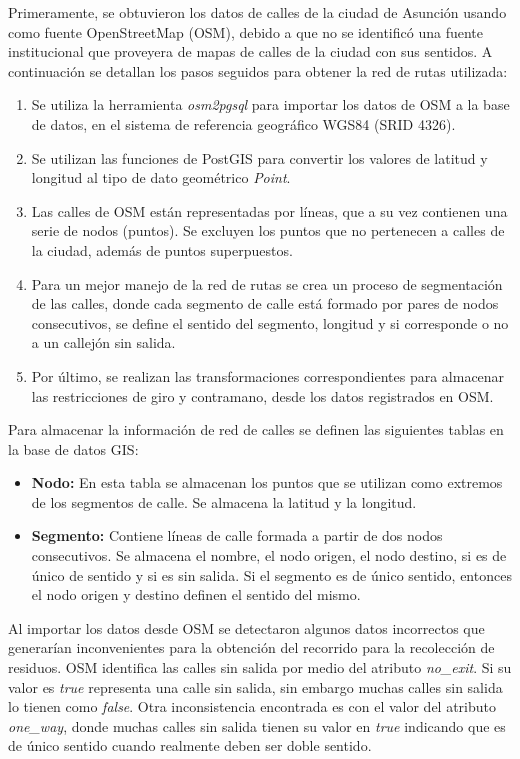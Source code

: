 Primeramente, se obtuvieron los datos de calles de la ciudad de Asunción usando como fuente OpenStreetMap (OSM), debido a que no se identificó una fuente institucional que proveyera de mapas de calles de la ciudad con sus sentidos. A continuación se detallan los pasos seguidos para obtener la red de rutas utilizada: 
\begin{enumerate}
    \item Se utiliza la herramienta \textit{osm2pgsql} para importar los datos de OSM a la base de datos, en el sistema de referencia geográfico WGS84 (SRID 4326). 
    \item Se utilizan las funciones de PostGIS para convertir los valores de latitud y longitud al tipo de dato geométrico \textit{Point}. 
    \item Las calles de OSM están representadas por líneas, que a su vez contienen una serie de nodos (puntos). Se excluyen los puntos que no pertenecen a calles de la ciudad, además de puntos superpuestos.
    \item Para un mejor manejo de la red de rutas se crea un proceso de segmentación de las calles, donde cada segmento de calle está formado por pares de nodos consecutivos, se define el sentido del segmento, longitud y si corresponde o no a un callejón sin salida.
    \item Por último, se realizan las transformaciones correspondientes para almacenar las restricciones de giro y contramano, desde los datos registrados en OSM.
\end{enumerate}

Para almacenar la información de red de calles se definen las siguientes tablas en la base de datos GIS:

\begin{itemize}
    \item \textbf{Nodo:} En esta tabla se almacenan los puntos que se utilizan como extremos de los segmentos de calle. Se almacena la latitud y la longitud.
    \item \textbf{Segmento:} Contiene líneas de calle formada a partir de dos nodos consecutivos. Se almacena el nombre, el nodo origen, el nodo destino, si es de único de sentido y si es sin salida. Si el segmento es de único sentido, entonces el nodo origen y destino definen el sentido del mismo.
\end{itemize}

Al importar los datos desde OSM se detectaron algunos datos incorrectos que generarían inconvenientes para la obtención del recorrido para la recolección de residuos. OSM identifica las calles sin salida por medio del atributo \textit{no\_exit}. Si su valor es \textit{true} representa una calle sin salida, sin embargo muchas calles sin salida lo tienen como \textit{false}. Otra inconsistencia encontrada es con el valor del atributo \textit{one\_way}, donde muchas calles sin salida tienen su valor en \textit{true} indicando que es de único sentido cuando realmente deben ser doble sentido.

